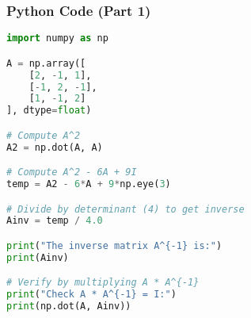\documentclass{beamer}
\begin{document}
\begin{frame}[fragile]
\frametitle{Python Code (Part 1)}
\begin{lstlisting}[language=Python]
import numpy as np

A = np.array([
    [2, -1, 1],
    [-1, 2, -1],
    [1, -1, 2]
], dtype=float)

# Compute A^2
A2 = np.dot(A, A)

# Compute A^2 - 6A + 9I
temp = A2 - 6*A + 9*np.eye(3)

# Divide by determinant (4) to get inverse
Ainv = temp / 4.0

print("The inverse matrix A^{-1} is:")
print(Ainv)

# Verify by multiplying A * A^{-1}
print("Check A * A^{-1} = I:")
print(np.dot(A, Ainv))
\end{lstlisting}
\end{frame}
\end{document}
